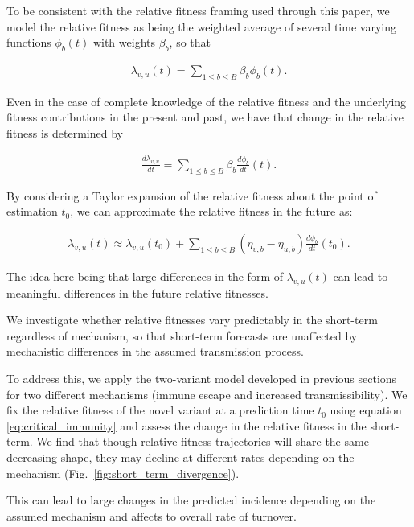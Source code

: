 \documentclass[12pt,oneside,letterpaper]{article}
\begin{document}
To be consistent with the relative fitness framing used through this paper, we model the relative fitness as being the weighted average of several time varying functions $\phi_{b}(t)$ with weights $\beta_{b}$, so that

\begin{align*}
\lambda_{v,u}(t) = \sum_{1 \leq b \leq B} \beta_{b} \phi_{b}(t).
\end{align*}

Even in the case of complete knowledge of the relative fitness and the underlying fitness contributions in the present and past, we have that change in the relative fitness is determined by

\begin{align*}
    \frac{d\lambda_{v,u}}{dt} = \sum_{1 \leq b \leq B} \beta_{b} \frac{d\phi_{b}}{dt}(t).
\end{align*}

By considering a Taylor expansion of the relative fitness about the point of estimation $t_{0}$, we can approximate the relative fitness in the future as:

\begin{align*}
    \lambda_{v,u}(t) \approx \lambda_{v,u}(t_{0}) + \sum_{1\leq b \leq B} (\eta_{v, b} - \eta_{u,b}) \frac{d\phi_b}{dt}(t_0).
\end{align*}

The idea here being that large differences in the form of $\lambda_{v,u}(t)$ can lead to meaningful differences in the future relative fitnesses.

We investigate whether relative fitnesses vary predictably in the short-term regardless of mechanism, so that short-term forecasts are unaffected by mechanistic differences in the assumed transmission process.

To address this, we apply the two-variant model developed in previous sections for two different mechanisms (immune escape and increased transmissibility).
We fix the relative fitness of the novel variant at a prediction time $t_{0}$ using equation \ref{eq:critical_immunity} and assess the change in the relative fitness in the short-term.
We find that though relative fitness trajectories will share the same decreasing shape, they may decline at different rates depending on the mechanism (Fig.~\ref{fig:short_term_divergence}).

This can lead to large changes in the predicted incidence depending on the assumed mechanism and affects to overall rate of turnover.
\end{document}
